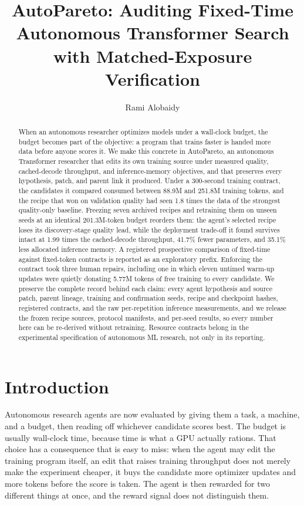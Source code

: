 \documentclass{article}
\title{AutoPareto: Auditing Fixed-Time Autonomous Transformer Search\\with Matched-Exposure Verification}
\author{Rami Alobaidy}
\begin{document}
\maketitle

\begin{abstract}
When an autonomous researcher optimizes models under a wall-clock budget, the budget becomes part of the objective: a program that trains faster is handed more data before anyone scores it. We make this concrete in AutoPareto, an autonomous Transformer researcher that edits its own training source under measured quality, cached-decode throughput, and inference-memory objectives, and that preserves every hypothesis, patch, and parent link it produced. Under a 300-second training contract, the candidates it compared consumed between 88.9M and 251.8M training tokens, and the recipe that won on validation quality had seen 1.8 times the data of the strongest quality-only baseline. Freezing seven archived recipes and retraining them on unseen seeds at an identical 201.3M-token budget reorders them: the agent's selected recipe loses its discovery-stage quality lead, while the deployment trade-off it found survives intact at 1.99 times the cached-decode throughput, 41.7\% fewer parameters, and 35.1\% less allocated inference memory. A registered prospective comparison of fixed-time against fixed-token contracts is reported as an exploratory prefix. Enforcing the contract took three human repairs, including one in which eleven untimed warm-up updates were quietly donating 5.77M tokens of free training to every candidate. We preserve the complete record behind each claim: every agent hypothesis and source patch, parent lineage, training and confirmation seeds, recipe and checkpoint hashes, registered contracts, and the raw per-repetition inference measurements, and we release the frozen recipe sources, protocol manifests, and per-seed results, so every number here can be re-derived without retraining. Resource contracts belong in the experimental specification of autonomous ML research, not only in its reporting.
\end{abstract}

\section{Introduction}
Autonomous research agents are now evaluated by giving them a task, a machine, and a budget, then reading off whichever candidate scores best. The budget is usually wall-clock time, because time is what a GPU actually rations. That choice has a consequence that is easy to miss: when the agent may edit the training program itself, an edit that raises training throughput does not merely make the experiment cheaper, it buys the candidate more optimizer updates and more tokens before the score is taken. The agent is then rewarded for two different things at once, and the reward signal does not distinguish them.
\end{document}
